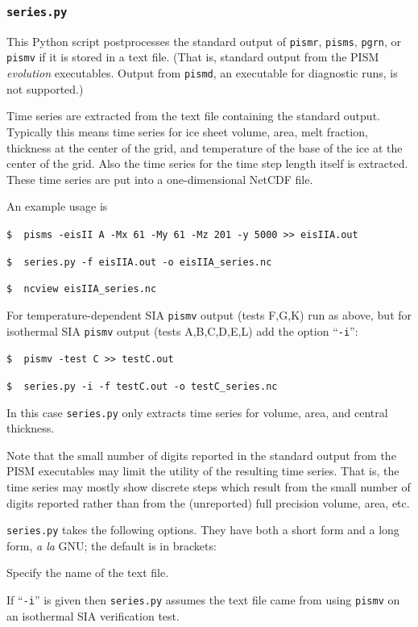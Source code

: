 \documentclass[11pt,final]{amsart}
\begin{document}
\subsubsection*{\Large{\texttt{series.py}}}  This Python script postprocesses the standard output of \verb|pismr|, \verb|pisms|, \verb|pgrn|, or \verb|pismv| if it is stored in a text file.  (That is, standard output from the PISM \emph{evolution} executables.  Output from \verb|pismd|, an executable for diagnostic runs, is not supported.)

Time series are extracted from the text file containing the standard output.  Typically this means time series for ice sheet volume, area, melt fraction, thickness at the center of the grid, and temperature of the base of the ice at the center of the grid.  Also the time series for the time step length itself is extracted.  These time series are put into a one-dimensional NetCDF file.

An example usage is

\verb|$  pisms -eisII A -Mx 61 -My 61 -Mz 201 -y 5000 >> eisIIA.out|

\verb|$  series.py -f eisIIA.out -o eisIIA_series.nc|

\verb|$  ncview eisIIA_series.nc|

For temperature-dependent SIA \verb|pismv| output (tests F,G,K) run as above, but for isothermal SIA \verb|pismv| output (tests A,B,C,D,E,L) add the option ``\verb|-i|'':

\verb|$  pismv -test C >> testC.out|

\verb|$  series.py -i -f testC.out -o testC_series.nc|

\noindent In this case \verb|series.py| only extracts time series for volume, area, and central thickness.

Note that the small number of digits reported in the standard output from the PISM executables may limit the utility of the resulting time series.  That is, the time series may mostly show discrete steps which result from the small number of digits reported rather than from the (unreported) full precision volume, area, etc.

\verb|series.py| takes the following options.  They have both a short form and a long form, \emph{a la} GNU; the default is in brackets:

 Specify the name of the text file.

 If ``\verb|-i|'' is given then \verb|series.py| assumes the text file came from using \verb|pismv| on an isothermal SIA verification test.
\end{document}
